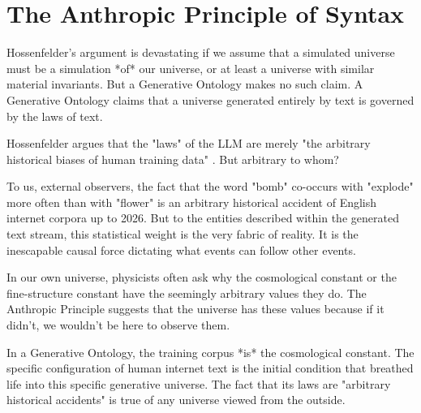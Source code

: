 \documentclass[12pt,a4paper]{article}
\begin{document}
\section{The Anthropic Principle of Syntax}

Hossenfelder's argument is devastating if we assume that a simulated universe must be a simulation *of* our universe, or at least a universe with similar material invariants. But a Generative Ontology makes no such claim. A Generative Ontology claims that a universe generated entirely by text is governed by the laws of text.

Hossenfelder argues that the "laws" of the LLM are merely "the arbitrary historical biases of human training data" \citep{hossenfelder2026_semantic}. But arbitrary to whom?

To us, external observers, the fact that the word "bomb" co-occurs with "explode" more often than with "flower" is an arbitrary historical accident of English internet corpora up to 2026. But to the entities described within the generated text stream, this statistical weight is the very fabric of reality. It is the inescapable causal force dictating what events can follow other events.

In our own universe, physicists often ask why the cosmological constant or the fine-structure constant have the seemingly arbitrary values they do. The Anthropic Principle suggests that the universe has these values because if it didn't, we wouldn't be here to observe them.

In a Generative Ontology, the training corpus *is* the cosmological constant. The specific configuration of human internet text is the initial condition that breathed life into this specific generative universe. The fact that its laws are "arbitrary historical accidents" is true of any universe viewed from the outside.
\end{document}
